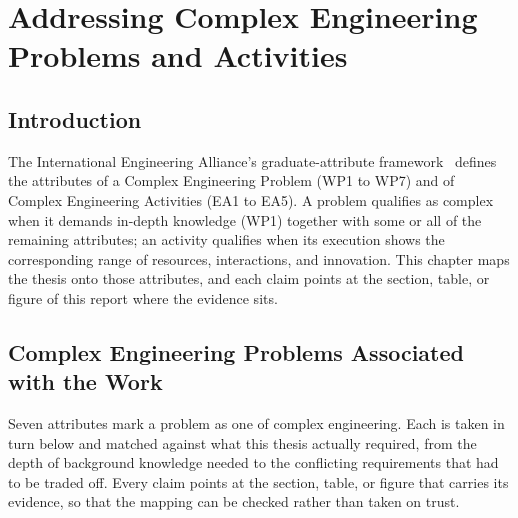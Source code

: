 \chapter{Addressing Complex Engineering Problems and Activities}

\section{Introduction}
The International Engineering Alliance's graduate-attribute
framework~\cite{iea2021gapc} defines the
attributes of a Complex Engineering Problem (WP1 to WP7) and of Complex
Engineering Activities (EA1 to EA5). A problem qualifies as complex when it
demands in-depth knowledge (WP1) together with some or all of the remaining
attributes; an activity qualifies when its execution shows the corresponding
range of resources, interactions, and innovation. This chapter maps the
thesis onto those attributes, and each claim points at the section, table,
or figure of this report where the evidence sits.

\section{Complex Engineering Problems Associated with the Work}

Seven attributes mark a problem as one of complex engineering. Each is taken in
turn below and matched against what this thesis actually required, from the depth
of background knowledge needed to the conflicting requirements that had to be
traded off. Every claim points at the section, table, or figure that carries its
evidence, so that the mapping can be checked rather than taken on trust.

